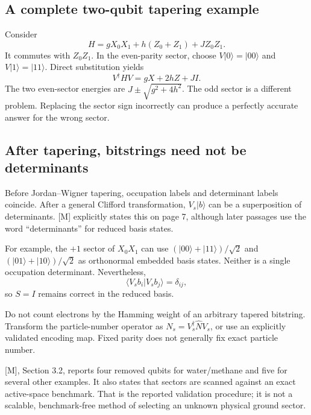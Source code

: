 \documentclass[11pt,a4paper,oneside]{report}
\newcommand{\ket}[1]{\lvert #1\rangle}
\newcommand{\braket}[2]{\langle #1\vert #2\rangle}
\begin{document}
\subsection{A complete two-qubit tapering example}
Consider
\begin{equation}
H=gX_0X_1+h(Z_0+Z_1)+JZ_0Z_1.
\end{equation}
It commutes with $Z_0Z_1$. In the even-parity sector, choose $V\ket0=\ket{00}$ and $V\ket1=\ket{11}$. Direct substitution yields
\begin{equation}
V^\dagger HV=gX+2hZ+JI.
\end{equation}
The two even-sector energies are $J\pm\sqrt{g^2+4h^2}$. The odd sector is a different problem. Replacing the sector sign incorrectly can produce a perfectly accurate answer for the wrong sector.

\subsection{After tapering, bitstrings need not be determinants}
Before Jordan--Wigner tapering, occupation labels and determinant labels coincide. After a general Clifford transformation, $V_s\ket b$ can be a superposition of determinants. [M] explicitly states this on page 7, although later passages use the word ``determinants'' for reduced basis states.

For example, the $+1$ sector of $X_0X_1$ can use $(\ket{00}+\ket{11})/\sqrt2$ and $(\ket{01}+\ket{10})/\sqrt2$ as orthonormal embedded basis states. Neither is a single occupation determinant. Nevertheless,
\begin{equation}
\braket{V_sb_i}{V_sb_j}=\delta_{ij},
\end{equation}
so $S=I$ remains correct in the reduced basis.

Do not count electrons by the Hamming weight of an arbitrary tapered bitstring. Transform the particle-number operator as $N_s=V_s^\dagger\hat N V_s$, or use an explicitly validated encoding map. Fixed parity does not generally fix exact particle number.

\begin{sourcebox}
{[M]}, Section 3.2, reports four removed qubits for water/methane and five for several other examples. It also states that sectors are scanned against an exact active-space benchmark. That is the reported validation procedure; it is not a scalable, benchmark-free method of selecting an unknown physical ground sector.
\end{sourcebox}
\end{document}
